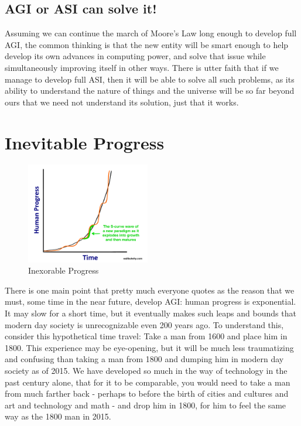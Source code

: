 \documentclass[12pt]{article} %
\begin{document}

\subsection{AGI or ASI can solve it!} %

Assuming we can continue the march of Moore's Law long enough to develop full AGI, the common thinking is that the new entity will be smart enough to help develop its own advances in computing power, and solve that issue while simultaneously improving itself in other ways. There is utter faith that if we manage to develop full ASI, then it will be able to solve all such problems, as its ability to understand the nature of things and the universe will be so far beyond ours that we need not understand its solution, just that it works.


\section{Inevitable Progress} %

\begin{figure}
  \begin{center}
    \includegraphics[width=0.48\textwidth]{curvyexponential}
  \end{center}
  \caption{Inexorable Progress}
\end{figure}

There is one main point that pretty much everyone quotes as the reason that we must, some time in the near future, develop AGI: human progress is exponential. It may slow for a short time, but it eventually makes such leaps and bounds that modern day society is unrecognizable even 200 years ago. To understand this, consider this hypothetical time travel: Take a man from 1600 and place him in 1800. This experience may be eye-opening, but it will be much less traumatizing and confusing than taking a man from 1800 and dumping him in modern day society as of 2015. We have developed so much in the way of technology in the past century alone, that for it to be comparable, you would need to take a man from much farther back - perhaps to before the birth of cities and cultures and art and technology and math - and drop him in 1800, for him to feel the same way as the 1800 man in 2015.
\end{document}
